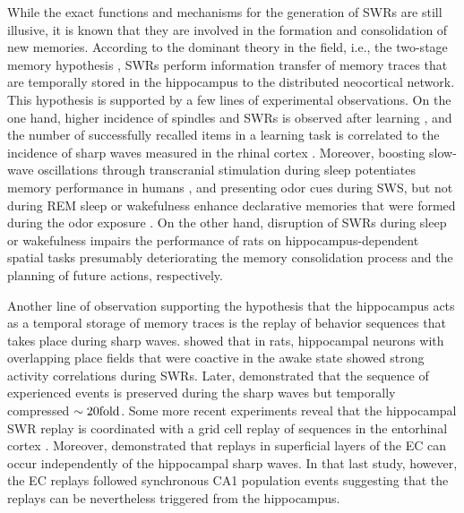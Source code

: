     While the exact functions and mechanisms for the generation of SWRs are
    still illusive, it is known that they are involved in the formation and
    consolidation of new memories. According to the dominant theory in the
    field, i.e., the two-stage memory hypothesis \citep{Buzsaki1989}, SWRs perform
    information transfer of memory traces that are temporally stored in the
    hippocampus to the distributed neocortical network. This hypothesis is
    supported by a few lines of experimental observations. On the one hand,
    higher incidence of spindles and SWRs is observed after learning \citep{Eschenko2006, Eschenko2008,
    Girardeau2014}, and the number of successfully recalled items in a learning
    task is correlated to the incidence of sharp waves measured in the rhinal
    cortex \citep{Axmacher2008}. Moreover, boosting slow-wave oscillations
    through transcranial stimulation during sleep potentiates memory
    performance in humans \citep{Marshall2006}, and presenting odor cues during
    SWS, but not during REM sleep or wakefulness enhance declarative memories
    that were formed during the odor exposure \citep{Rasch2007}. On the other
    hand, disruption of SWRs during sleep or wakefulness impairs the
    performance of rats on hippocampus-dependent spatial tasks
    \citep{Girardeau2009, Jadhav2012} presumably deteriorating the memory
    consolidation process and the planning of future actions, respectively.

    Another line of observation supporting the hypothesis that the hippocampus
    acts as a temporal storage of memory traces is the replay of behavior
    sequences that takes place during sharp waves. \cite{Wilson1994} showed that
    in rats, hippocampal neurons with overlapping place fields that were
    coactive in the awake state showed strong activity correlations during
    SWRs. Later, \cite{Lee2002} demonstrated that the sequence of experienced
    events is preserved during the sharp waves but temporally compressed $\sim
    20\rm fold$. Some more recent experiments reveal that the hippocampal SWR
    replay is coordinated with a grid cell replay of sequences in the
    entorhinal cortex \citep{Olafsdottir2016}. Moreover, \cite{Oneill2017}
    demonstrated that replays in superficial layers of the EC can occur
    independently of the hippocampal sharp waves. In that last study, however,
    the EC replays followed synchronous CA1 population events suggesting that
    the replays can be nevertheless triggered from the hippocampus.
     
